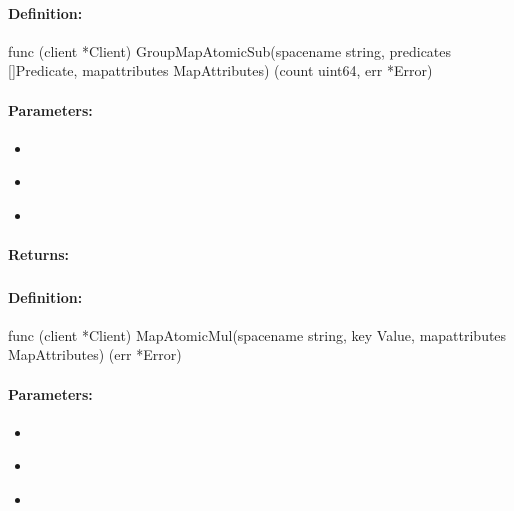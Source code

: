\paragraph{Definition:}
\begin{gocode}
func (client *Client) GroupMapAtomicSub(spacename string, predicates []Predicate, mapattributes MapAttributes) (count uint64, err *Error)
\end{gocode}

\paragraph{Parameters:}
\begin{itemize}[noitemsep]
\item {}\\

\item {}\\

\item {}\\

\end{itemize}

\paragraph{Returns:}


\pagebreak
\subsubsection{}
\label{api:Go:MapAtomicMul}


\paragraph{Definition:}
\begin{gocode}
func (client *Client) MapAtomicMul(spacename string, key Value, mapattributes MapAttributes) (err *Error)
\end{gocode}

\paragraph{Parameters:}
\begin{itemize}[noitemsep]
\item {}\\

\item {}\\

\item {}\\

\end{itemize}

